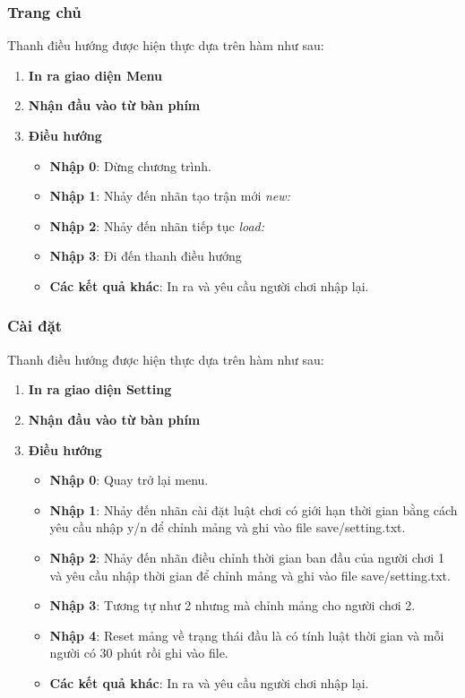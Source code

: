 \subsubsection{Trang chủ}
Thanh điều hướng  được hiện thực dựa trên hàm  như sau:
\begin{enumerate}
   \item \textbf{In ra giao diện Menu}
   \item \textbf{Nhận đầu vào từ bàn phím}
   \item \textbf{Điều hướng}
   \begin{itemize}
      \item \textbf{Nhập 0}: Dừng chương trình.
      \item \textbf{Nhập 1}: Nhảy đến nhãn tạo trận mới \textit{new:}
      \item \textbf{Nhập 2}: Nhảy đến nhãn tiếp tục \textit{load:}
      \item \textbf{Nhập 3}: Đi đến thanh điều hướng 
      \item \textbf{Các kết quả khác}: In ra và yêu cầu người chơi nhập lại.
   \end{itemize}
\end{enumerate}
\subsubsection{Cài đặt}
Thanh điều hướng  được hiện thực dựa trên hàm  như sau:
\begin{enumerate}
   \item \textbf{In ra giao diện Setting}
   \item \textbf{Nhận đầu vào từ bàn phím}
   \item \textbf{Điều hướng}
   \begin{itemize}
      \item \textbf{Nhập 0}: Quay trở lại menu.
      \item \textbf{Nhập 1}: Nhảy đến nhãn cài đặt luật chơi có giới hạn thời gian bằng cách yêu cầu nhập y/n để chỉnh mảng và ghi vào file save/setting.txt.
      \item \textbf{Nhập 2}: Nhảy đến nhãn điều chỉnh thời gian ban đầu của người chơi 1 và yêu cầu nhập thời gian để chỉnh mảng và ghi vào file save/setting.txt.
      \item \textbf{Nhập 3}: Tương tự như 2 nhưng mà chỉnh mảng cho người chơi 2.
      \item \textbf{Nhập 4}: Reset mảng về trạng thái đầu là có tính luật thời gian và mỗi người có 30 phút rồi ghi vào file.
      \item \textbf{Các kết quả khác}: In ra và yêu cầu người chơi nhập lại.
   \end{itemize}
\end{enumerate}


